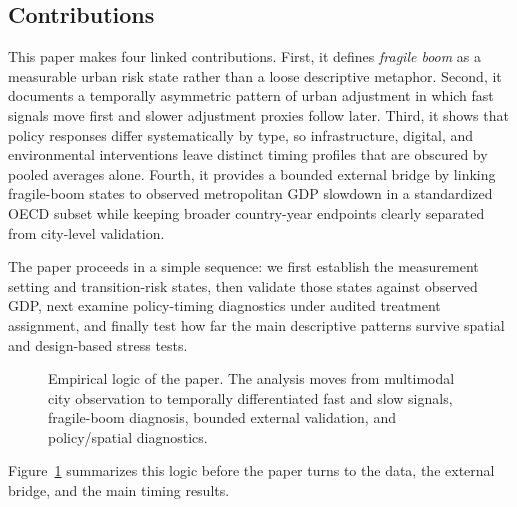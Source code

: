 \documentclass[11pt,a4paper]{article}
\begin{document}
\subsection{Contributions}
This paper makes four linked contributions.
First, it defines \emph{fragile boom} as a measurable urban risk state rather than a loose descriptive metaphor.
Second, it documents a temporally asymmetric pattern of urban adjustment in which fast signals move first and slower adjustment proxies follow later.
Third, it shows that policy responses differ systematically by type, so infrastructure, digital, and environmental interventions leave distinct timing profiles that are obscured by pooled averages alone.
Fourth, it provides a bounded external bridge by linking fragile-boom states to observed metropolitan GDP slowdown in a standardized OECD subset while keeping broader country-year endpoints clearly separated from city-level validation.

The paper proceeds in a simple sequence: we first establish the measurement setting and transition-risk states, then validate those states against observed GDP, next examine policy-timing diagnostics under audited treatment assignment, and finally test how far the main descriptive patterns survive spatial and design-based stress tests.

\begin{figure}[H]
  \centering
  \caption{Empirical logic of the paper. The analysis moves from multimodal city observation to temporally differentiated fast and slow signals, fragile-boom diagnosis, bounded external validation, and policy/spatial diagnostics.}
  \label{fig:evidence_chain}
\end{figure}
\FloatBarrier

Figure~\ref{fig:evidence_chain} summarizes this logic before the paper turns to the data, the external bridge, and the main timing results.
\end{document}
